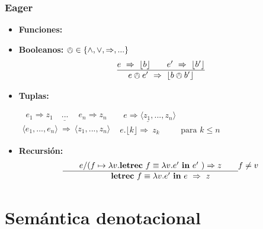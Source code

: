     \subsubsection{Eager}
      \begin{itemize}
        \item \textbf{Funciones:}
          \begin{prooftree}
          \end{prooftree}
        \item \textbf{Booleanos:} $\owedge \in \{\wedge, \vee, \Rightarrow,...\}$
          \[\begin{array}{c}
          \underline{e\ \Rightarrow\ \lfloor b\rfloor\qquad e'\ \Rightarrow\ \lfloor b'\rfloor}\\
          e \owedge e'\ \Rightarrow\ \lfloor b \owedge b'\rfloor
          \end{array}\]
        \item \textbf{Tuplas:}
          \begin{multicols}{2}
            $\begin{array}{c}
              \underline{\ \ e_1 \Rightarrow z_1 \quad ... \quad \ e_n \Rightarrow z_n } \\
              \langle e_1,...,e_n\rangle\ \Rightarrow\ \langle z_1,...,z_n\rangle
            \end{array}$
            $\begin{array}{c}
              \underline{\ \ e \Rightarrow \langle z_1,...,z_n\rangle} \qquad \qquad \qquad \qquad \\
              e.\lfloor k\rfloor \Rightarrow\ z_k \qquad \ \text{ para } k \leq n
            \end{array}$
          \end{multicols}
        \item \textbf{Recursión:}
          \[\begin{array}{c}
            \underline{\qquad e/(f\mapsto \lambda v.\letrecin{f \equiv \lambda v.e'}{e'})
            \Rightarrow z\qquad } f \neq v\\
            \letrecin{f \equiv \lambda v.e'}{e} \Rightarrow \ z
          \end{array}\]
      \end{itemize}

  \section{Semántica denotacional}
